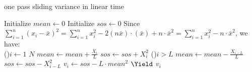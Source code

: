 \documentclass{article}
\begin{document}
	\begin{algorithm}[H]
		\caption{one pass sliding variance in linear time}\label{algorithm}
		Initialize $mean\leftarrow 0$\;
        Initialize $sos\leftarrow 0$\;
        Since $\sum\limits_{i=1}^{n}(x_i-\bar{x})^2=
                \sum\limits_{i=1}^{n}x_i^2-2(n\bar{x})\cdot(\bar{x})+n\cdot\bar{x}^2=
                \sum\limits_{i=1}^{n}x_i^2-n\cdot \bar{x}^2$, we have:\\
        \For(){$i\leftarrow 1$ \KwTo $N$}{
            $mean\leftarrow mean+\frac{X_i}{L}$\;
            $sos\leftarrow sos+X_i^2$\;
            \If(){$i>L$}{
                $mean\leftarrow mean-\frac{X_{i-L}}{L}$\;
                $sos\leftarrow sos-X_{i-L}^2$\;
            }
            $v_i\leftarrow sos-L\cdot mean^2$\;
            $\Yield$ $v_i$\;
        }
	\end{algorithm}
\end{document}
